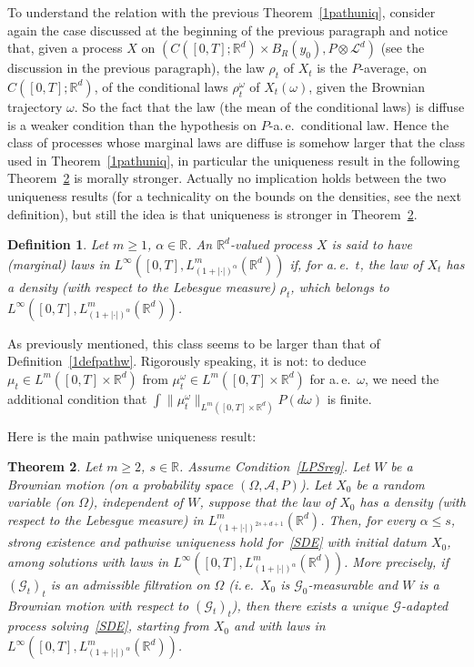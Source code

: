 \documentclass[a4paper,10pt]{article}
\newtheorem{theorem}{Theorem}
\newtheorem{definition}[theorem]{Definition}
\newcommand{\mr}{\mathbb{R}}
\newcommand{\mc}{\mathcal}
\begin{document}
To understand the relation with the previous Theorem~\ref{1pathuniq}, consider again the case discussed at the beginning of the previous paragraph and notice that, given a process $X$ on $(C([0,T];\mr^d)\times B_R(y_0),P\otimes\mc{L}^d)$ (see the discussion in the previous paragraph), the law $\rho_t$ of $X_t$ is the $P$-average, on $C([0,T];\mr^d)$, of the conditional laws $\rho^\omega_t$ of $X_t(\omega)$, given the Brownian trajectory $\omega$. So the fact that the law (the mean of the conditional laws) is diffuse is a weaker condition than the hypothesis on $P$-a.\,e.\ conditional law. Hence the class of processes whose marginal laws are diffuse is somehow larger that the class used in Theorem~\ref{1pathuniq}, in particular the uniqueness result in the following Theorem~\ref{2pathwise} is morally stronger. Actually no implication holds between the two uniqueness results (for a technicality on the bounds on the densities, see the next definition), but still the idea is that uniqueness is stronger in Theorem~\ref{2pathwise}.

\begin{definition}
Let $m \geq 1$, $\alpha\in\mr$. An $\mr^d$-valued process $X$ is said to have (marginal) laws in $L^\infty([0,T],L^m_{(1+|\cdot|)^{\alpha}}(\mr^d))$ if, for a.\,e.\ $t$, the law of $X_t$ has a density (with respect to the Lebesgue measure) $\rho_t$, which belongs to $L^\infty([0,T],L^m_{(1+|\cdot|)^{\alpha}}(\mr^d))$.
\end{definition}

As previously mentioned, this class seems to be larger than that of Definition~\ref{1defpathw}. Rigorously speaking, it is not: to deduce $\mu_t\in L^m([0,T]\times\mr^d)$ from $\mu^\omega_t\in L^m([0,T]\times\mr^d)$ for a.\,e.\ $\omega$, we need the additional condition that $\int\|\mu_t^\omega\|_{L^m([0,T]\times\mr^d)}P(d\omega)$ is finite.

Here is the main pathwise uniqueness result:

\begin{theorem}\label{2pathwise}
Let $m\ge2$, $s\in\mr$. Assume Condition~\ref{LPSreg}. Let $W$ be a Brownian motion (on a probability space $(\Omega,\mc{A},P)$). Let $X_0$ be a random variable (on $\Omega$), independent of $W$, suppose that the law of $X_0$ has a density (with respect to the Lebesgue measure) in $L^m_{(1+|\cdot|)^{2s+d+1}}(\mr^d)$. Then, for every $\alpha\le s$, strong existence and pathwise uniqueness hold for~\eqref{SDE} with initial datum $X_0$, among solutions with laws in $L^\infty([0,T],L^m_{(1+|\cdot|)^{\alpha}}(\mr^d))$. More precisely, if $(\mc{G}_t)_t$ is an admissible filtration on $\Omega$ (i.\,e.\ $X_0$ is $\mc{G}_0$-measurable and $W$ is a Brownian motion with respect to $(\mc{G}_t)_t$), then there exists a unique $\mc{G}$-adapted process solving~\eqref{SDE}, starting from $X_0$ and with laws in $L^\infty([0,T],L^m_{(1+|\cdot|)^{\alpha}}(\mr^d))$.
\end{theorem}
\end{document}
